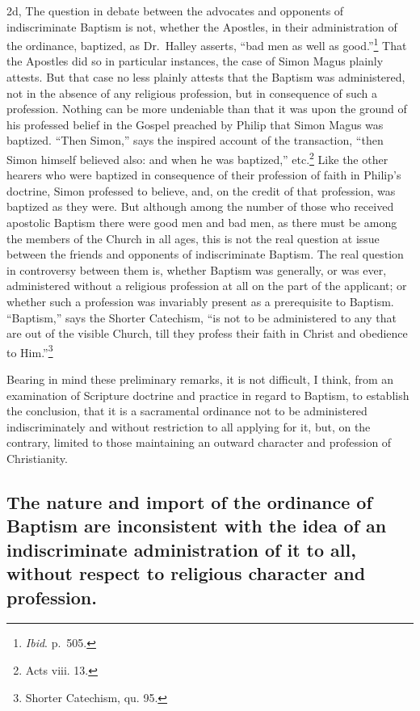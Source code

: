 \documentclass[]{book}
\begin{document}
2d, The question in debate between the advocates and opponents of indiscriminate Baptism is not, whether the Apostles, in their administration of the ordinance, baptized, as Dr.~Halley asserts, ``bad men as well as good.''\footnote{\emph{Ibid}. p.~505.} That the Apostles did so in particular instances, the case of Simon Magus plainly attests. But that case no less plainly attests that the Baptism was administered, not in the absence of any religious profession, but in consequence of such a profession. Nothing can be more undeniable than that it was upon the ground of his professed belief in the Gospel preached by Philip that Simon Magus was baptized. ``Then Simon,'' says the inspired account of the transaction, ``then Simon himself believed also: and when he was baptized,'' etc.\footnote{Acts viii. 13.} Like the other hearers who were baptized in consequence of their profession of faith in Philip's doctrine, Simon professed to believe, and, on the credit of that profession, was baptized as they were. But although among the number of those who received apostolic Baptism there were good men and bad men, as there must be among the members of the Church in all ages, this is not the real question at issue between the friends and opponents of indiscriminate Baptism. The real question in controversy between them is, whether Baptism was generally, or was ever, administered without a religious profession at all on the part of the applicant; or whether such a profession was invariably present as a prerequisite to Baptism. ``Baptism,'' says the Shorter Catechism, ``is not to be administered to any that are out of the visible Church, till they profess their faith in Christ and obedience to Him.''\footnote{Shorter Catechism, qu. 95.}

Bearing in mind these preliminary remarks, it is not difficult, I think, from an examination of Scripture doctrine and practice in regard to Baptism, to establish the conclusion, that it is a sacramental ordinance not to be administered indiscriminately and without restriction to all applying for it, but, on the contrary, limited to those maintaining an outward character and profession of Christianity.

\hypertarget{the-nature-and-import-of-the-ordinance-of-baptism-are-inconsistent-with-the-idea-of-an-indiscriminate-administration-of-it-to-all-without-respect-to-religious-character-and-profession.}{%
\subsection{The nature and import of the ordinance of Baptism are inconsistent with the idea of an indiscriminate administration of it to all, without respect to religious character and profession.}\label{the-nature-and-import-of-the-ordinance-of-baptism-are-inconsistent-with-the-idea-of-an-indiscriminate-administration-of-it-to-all-without-respect-to-religious-character-and-profession.}}
\end{document}
